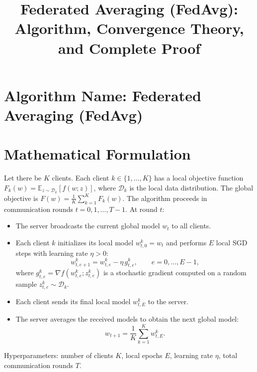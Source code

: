 \documentclass{article}
\title{Federated Averaging (FedAvg): Algorithm, Convergence Theory, and Complete Proof}
\author{}
\date{}
\begin{document}
\maketitle

\section*{Algorithm Name: Federated Averaging (FedAvg)}

\section*{Mathematical Formulation}
Let there be $K$ clients. Each client $k \in \{1,\dots,K\}$ has a local objective function $F_k(w) = \mathbb{E}_{z \sim \mathcal{D}_k}[f(w; z)]$, where $\mathcal{D}_k$ is the local data distribution. The global objective is $F(w) = \frac{1}{K}\sum_{k=1}^K F_k(w)$. The algorithm proceeds in communication rounds $t = 0, 1, \dots, T-1$. At round $t$:
\begin{itemize}
    \item The server broadcasts the current global model $w_t$ to all clients.
    \item Each client $k$ initializes its local model $w_{t,0}^k = w_t$ and performs $E$ local SGD steps with learning rate $\eta > 0$:
    \begin{equation}
        w_{t,e+1}^k = w_{t,e}^k - \eta \, g_{t,e}^k, \qquad e = 0,\dots,E-1,
    \end{equation}
    where $g_{t,e}^k = \nabla f(w_{t,e}^k; z_{t,e}^k)$ is a stochastic gradient computed on a random sample $z_{t,e}^k \sim \mathcal{D}_k$.
    \item Each client sends its final local model $w_{t,E}^k$ to the server.
    \item The server averages the received models to obtain the next global model:
    \begin{equation}
        w_{t+1} = \frac{1}{K}\sum_{k=1}^K w_{t,E}^k.
    \end{equation}
\end{itemize}
Hyperparameters: number of clients $K$, local epochs $E$, learning rate $\eta$, total communication rounds $T$.
\end{document}
